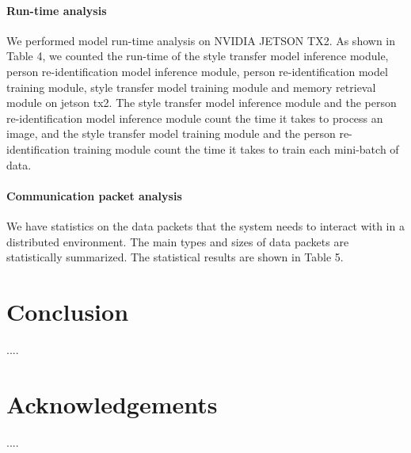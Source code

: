\documentclass{article}
\begin{document}
\paragraph{Run-time analysis}
We performed model run-time analysis on NVIDIA JETSON TX2. As shown in Table 4, we counted the run-time of the style transfer model inference module, person re-identification model inference module, person re-identification model training module, style transfer model training module and memory retrieval module on jetson tx2. The style transfer model inference module and the person re-identification model inference module count the time it takes to process an image, and the style transfer model training module and the person re-identification training module count the time it takes to train each mini-batch of data.

\paragraph{Communication packet analysis} 
We have statistics on the data packets that the system needs to interact with in a distributed environment. The main types and sizes of data packets are statistically summarized. The statistical results are shown in Table 5.


\section{Conclusion}
....

\section{Acknowledgements}
....



\end{document}

